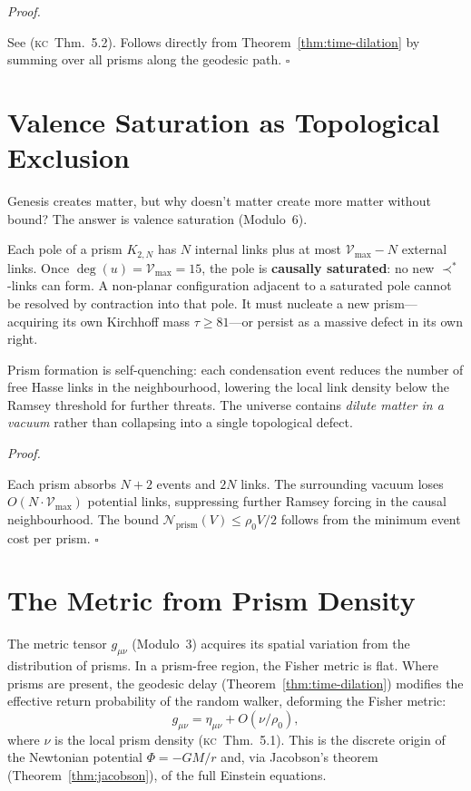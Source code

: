 \documentclass[11pt, a4paper, openany]{book}
\newcommand{\covers}{\prec^*}              %
\newcommand{\KC}[1]{\textnormal{(\textsc{kc}~#1)}}
\newcounter{thm}[chapter]
\renewenvironment{proof}[1][Proof]{%
  \par\noindent\textit{#1.}\quad
}{\hfill$\square$\par\medskip}
\begin{document}
\begin{proof}
See \KC{Thm.~5.2}. Follows directly from
Theorem~\ref{thm:time-dilation} by summing over all prisms along the
geodesic path.
\end{proof}

\section{Valence Saturation as Topological Exclusion}

Genesis creates matter, but why doesn't matter create more matter without
bound? The answer is valence saturation (Modulo~6).

Each pole of a prism $K_{2,N}$ has $N$ internal links plus at most
$\mathcal{V}_{\max} - N$ external links. Once $\deg(u) = \mathcal{V}_{\max} = 15$, the pole
is \textbf{causally saturated}: no new $\covers$-links can form. A
non-planar configuration adjacent to a saturated pole cannot be
resolved by contraction into that pole. It must nucleate a new
prism---acquiring its own Kirchhoff mass $\tau \geq 81$---or persist
as a massive defect in its own right.

\begin{corollary}\label{cor:self-limiting}
Prism formation is self-quenching: each condensation event reduces the
number of free Hasse links in the neighbourhood, lowering the local link
density below the Ramsey threshold for further threats. The universe
contains \emph{dilute matter in a vacuum} rather than collapsing into a
single topological defect.
\end{corollary}

\begin{proof}
Each prism absorbs $N + 2$ events and $2N$ links. The surrounding vacuum
loses $O(N \cdot \mathcal{V}_{\max})$ potential links, suppressing further Ramsey
forcing in the causal neighbourhood. The bound
$\mathcal{N}_{\mathrm{prism}}(V) \le \rho_0 V / 2$ follows from the
minimum event cost per prism.
\end{proof}

\section{The Metric from Prism Density}

The metric tensor $g_{\mu\nu}$ (Modulo~3) acquires its spatial variation
from the distribution of prisms. In a prism-free region, the Fisher
metric is flat. Where prisms are present, the geodesic delay
(Theorem~\ref{thm:time-dilation}) modifies the effective return
probability of the random walker, deforming the Fisher metric:
\[
  g_{\mu\nu} = \eta_{\mu\nu} + O(\nu/\rho_0),
\]
where $\nu$ is the local prism density \KC{Thm.~5.1}. This is the
discrete origin of the Newtonian potential $\Phi = -GM/r$ and, via
Jacobson's theorem (Theorem~\ref{thm:jacobson}), of the full Einstein
equations.
\end{document}
